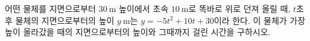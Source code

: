 어떤 물체를 지면으로부터 $30\ \mathrm{m}$ 높이에서 초속 $10\ \mathrm{m}$로 똑바로 위로 던져 올릴 때, $t$초 후 물체의 지면으로부터의 높이 $y\ \mathrm{m}$는 $y=-5t^2+10t+30$이라 한다. 이 물체가 가장 높이 올라갔을 때의 지면으로부터의 높이와 그때까지 걸린 시간을 구하시오.
